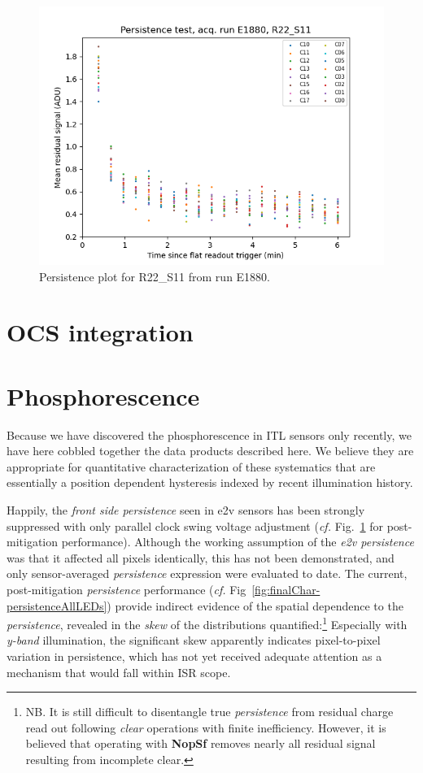 \begin{figure}
    \centering
    \includegraphics[width=0.8\linewidth]{figures/ReferenceFigures/persistence_plot_LSSTCam_R22_S11_u_lsstccs_eo_persistence_E1880_w_2024_35_20241101T020526Z.png}
    \caption{Persistence plot for R22\_S11 from run E1880.}
    \label{fig:ref:persistence}
\end{figure}

\clearpage
\section{OCS integration}

\clearpage
\section{Phosphorescence}\label{appendix:phosphorescence}
Because we have discovered the phosphorescence in ITL sensors only recently, we have here cobbled together the data products described here. We believe they are appropriate for quantitative characterization of these systematics that are essentially a position dependent hysteresis indexed by recent illumination history. 

Happily, the {\it front side persistence} seen in e2v sensors has been strongly suppressed with only parallel clock swing voltage adjustment ({\it cf.} Fig.~\ref{fig:ref:persistence} for post-mitigation performance). Although the working assumption of the {\it e2v persistence} was that it affected all pixels identically, this has not been demonstrated, and only sensor-averaged {\it persistence} expression were evaluated to date. The current, post-mitigation {\it persistence} performance ({\it cf.} Fig~\ref{fig:finalChar-persistenceAllLEDs}) provide indirect evidence of the spatial dependence to the {\it persistence}, revealed in the {\it skew} of the distributions quantified:\footnote{NB. It is still difficult to disentangle true {\it persistence} from residual charge read out following {\it clear} operations with finite inefficiency. However, it is believed that operating with {\bf NopSf} removes nearly all residual signal resulting from incomplete clear.} Especially with {\it y-band} illumination, the significant skew apparently indicates pixel-to-pixel variation in persistence, which has not yet received adequate attention as a mechanism that would fall within ISR scope.

